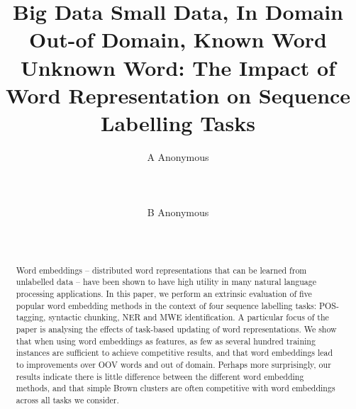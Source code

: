 \documentclass[11pt]{article}
\title{Big Data Small Data, In Domain Out-of Domain, Known Word Unknown
  Word: The Impact of Word Representation on Sequence Labelling Tasks}
\author{A Anonymous 
   \\%
   \\ %
   \\ %
  \\ %
\And
  B Anonymous
   \\%
   \\%
   \\ %
}
\date{}
\begin{document}
\maketitle


\begin{abstract} 
  Word embeddings -- distributed word representations that can be
  learned from unlabelled data -- have been shown to have high utility
  in many natural language processing applications. 
  In this paper, we perform an extrinsic evaluation of five popular word
  embedding methods in the context of four sequence labelling tasks:
  POS-tagging, syntactic chunking, NER and MWE identification.
  A particular focus of the paper is analysing the effects of task-based
  updating of word representations.
  We show that when using word embeddings as features, as few as
  several hundred training instances are sufficient to achieve competitive
  results, and that word embeddings lead to improvements over OOV words
  and out of domain.
  Perhaps more surprisingly, our results indicate there is little
  difference between the different word embedding methods, and that simple
  Brown clusters are often competitive with word embeddings across all
  tasks we consider. 
\end{abstract}

\newcommand{\gabi}[1]{\textcolor{blue}{#1}}
\newcommand{\tim}[1]{\textcolor{red}{#1}}
\newcommand{\lizhen}[1]{\textcolor{green}{#1}}
\newcommand{\nss}[1]{\textcolor{magenta}{#1}}













\end{document}
